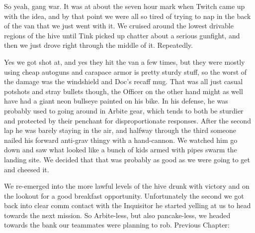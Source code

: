 So yeah, gang war. 
It was at about the seven hour mark when Twitch came up with the idea, and by that point we were all so tired of trying to nap in the back of the van that we just went with it. 
We cruised around the lowest drivable regions of the hive until Tink picked up chatter about a serious gunfight, and then we just drove right through the middle of it. 
Repeatedly.

Yes we got shot at, and yes they hit the van a few times, but they were mostly using cheap autoguns and carapace armor is pretty sturdy stuff, so the worst of the damage was the windshield and Doc's recaff mug. 
That was all just casual potshots and stray bullets though, the Officer on the other hand might as well have had a giant neon bullseye painted on his bike. 
In his defense, he was probably used to going around in Arbite gear, which tends to both be sturdier and protected by their penchant for disproportionate responses. 
After the second lap he was barely staying in the air, and halfway through the third someone nailed his forward anti-grav thingy with a hand-cannon. 
We watched him go down and saw what looked like a bunch of kids armed with pipes swarm the landing site. 
We decided that that was probably as good as we were going to get and cheesed it.

We re-emerged into the more lawful levels of the hive drunk with victory and on the lookout for a good breakfast opportunity. 
Unfortunately the second we got back into clear comm contact with the Inquisitor he started yelling at us to head towards the next mission. 
So Arbite-less, but also pancake-less, we headed towards the bank our teammates were planning to rob.
Previous Chapter: